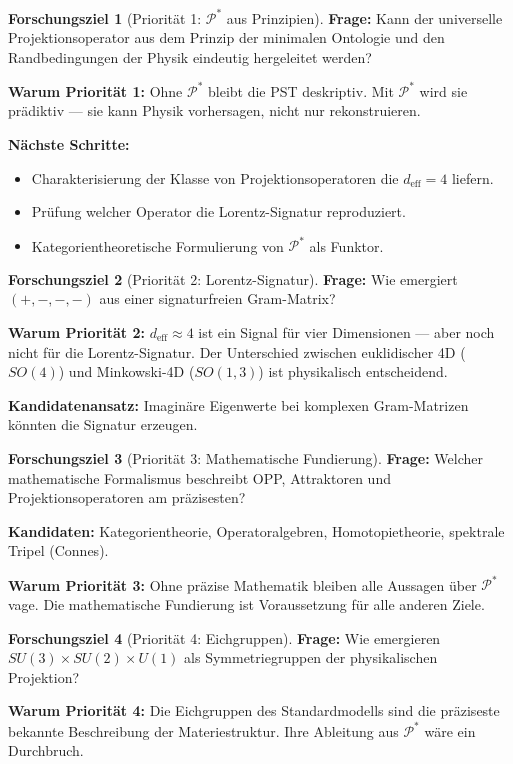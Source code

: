 \documentclass[11pt,a4paper]{article}
\theoremstyle{plain}
\theoremstyle{definition}
\newtheorem{ziel}{Forschungsziel}[section]
\newcommand{\deff}{d_{\mathrm{eff}}}
\newcommand{\Proj}{\mathcal{P}}
\begin{document}
\begin{ziel}[Priorit\"{a}t 1: $\Proj^\ast$ aus Prinzipien]
\textbf{Frage:} Kann der universelle Projektionsoperator aus dem Prinzip
der minimalen Ontologie und den Randbedingungen der Physik eindeutig
hergeleitet werden?

\textbf{Warum Priorit\"{a}t 1:} Ohne $\Proj^\ast$ bleibt die PST
deskriptiv. Mit $\Proj^\ast$ wird sie prädiktiv --- sie kann Physik
vorhersagen, nicht nur rekonstruieren.

\textbf{N\"{a}chste Schritte:}
\begin{itemize}
  \item Charakterisierung der Klasse von Projektionsoperatoren die
        $\deff = 4$ liefern.
  \item Pr\"{u}fung welcher Operator die Lorentz-Signatur reproduziert.
  \item Kategorientheoretische Formulierung von $\Proj^\ast$ als Funktor.
\end{itemize}
\end{ziel}

\begin{ziel}[Priorit\"{a}t 2: Lorentz-Signatur]
\textbf{Frage:} Wie emergiert $(+,-,-,-)$ aus einer signaturfreien
Gram-Matrix?

\textbf{Warum Priorit\"{a}t 2:} $\deff \approx 4$ ist ein Signal f\"{u}r
vier Dimensionen --- aber noch nicht f\"{u}r die Lorentz-Signatur.
Der Unterschied zwischen euklidischer 4D ($SO(4)$) und Minkowski-4D
($SO(1,3)$) ist physikalisch entscheidend.

\textbf{Kandidatenansatz:} Imagin\"{a}re Eigenwerte bei komplexen
Gram-Matrizen k\"{o}nnten die Signatur erzeugen.
\end{ziel}

\begin{ziel}[Priorit\"{a}t 3: Mathematische Fundierung]
\textbf{Frage:} Welcher mathematische Formalismus beschreibt OPP,
Attraktoren und Projektionsoperatoren am pr\"{a}zisesten?

\textbf{Kandidaten:} Kategorientheorie, Operatoralgebren, Homotopietheorie,
spektrale Tripel (Connes).

\textbf{Warum Priorit\"{a}t 3:} Ohne pr\"{a}zise Mathematik bleiben
alle Aussagen \"{u}ber $\Proj^\ast$ vage. Die mathematische Fundierung
ist Voraussetzung f\"{u}r alle anderen Ziele.
\end{ziel}

\begin{ziel}[Priorit\"{a}t 4: Eichgruppen]
\textbf{Frage:} Wie emergieren $SU(3) \times SU(2) \times U(1)$ als
Symmetriegruppen der physikalischen Projektion?

\textbf{Warum Priorit\"{a}t 4:} Die Eichgruppen des Standardmodells
sind die pr\"{a}ziseste bekannte Beschreibung der Materiestruktur.
Ihre Ableitung aus $\Proj^\ast$ w\"{a}re ein Durchbruch.
\end{ziel}
\end{document}
